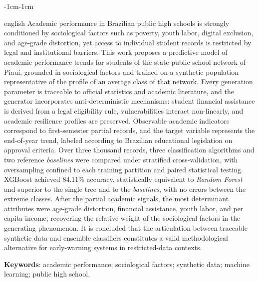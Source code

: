 \begin{adjustwidth}{-1cm}{-1cm}
\begin{resumo}[Abstract]
\begin{otherlanguage*}{english}
Academic performance in Brazilian public high schools is strongly conditioned by sociological factors such as poverty, youth labor, digital exclusion, and age-grade distortion, yet access to individual student records is restricted by legal and institutional barriers. This work proposes a predictive model of academic performance trends for students of the state public school network of Piauí, grounded in sociological factors and trained on a synthetic population representative of the profile of an average class of that network. Every generation parameter is traceable to official statistics and academic literature, and the generator incorporates anti-deterministic mechanisms: student financial assistance is derived from a legal eligibility rule, vulnerabilities interact non-linearly, and academic resilience profiles are preserved. Observable academic indicators correspond to first-semester partial records, and the target variable represents the end-of-year trend, labeled according to Brazilian educational legislation on approval criteria. Over three thousand records, three classification algorithms and two reference \textit{baselines} were compared under stratified cross-validation, with oversampling confined to each training partition and paired statistical testing. XGBoost achieved 84.11\% accuracy, statistically equivalent to \textit{Random Forest} and superior to the single tree and to the \textit{baselines}, with no errors between the extreme classes. After the partial academic signals, the most determinant attributes were age-grade distortion, financial assistance, youth labor, and per capita income, recovering the relative weight of the sociological factors in the generating phenomenon. It is concluded that the articulation between traceable synthetic data and ensemble classifiers constitutes a valid methodological alternative for early-warning systems in restricted-data contexts.

\vspace{\onelineskip}
\noindent
\textbf{Keywords}: academic performance; sociological factors; synthetic data; machine learning; public high school.
\end{otherlanguage*}
\end{resumo}
\end{adjustwidth}
